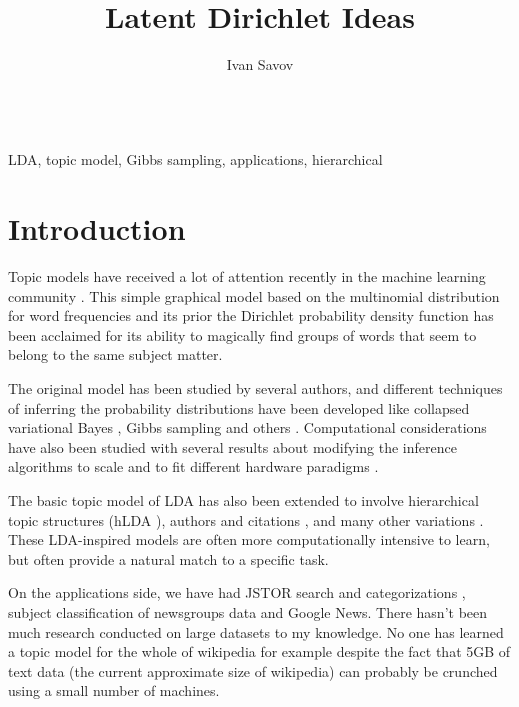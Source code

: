 \documentclass[letterpaper,12pt]{article}
\author{Ivan Savov}
\title{ {\LARGE Latent Dirichlet Ideas } }
\begin{document}
\maketitle


\ \\
 LDA, topic model, Gibbs sampling, applications, hierarchical


\section{Introduction}

	Topic models have received a lot of attention recently in the machine learning 
	community \cite{Blei2003,Blei2009}.
	This simple graphical model based on the multinomial distribution for word frequencies 
	and its prior the Dirichlet probability density function has been acclaimed for
	its ability to magically find groups of words that seem to belong to the same subject matter.
	
	
	The original model has been studied by several authors, and different 
	techniques of inferring the probability distributions have been developed
	like collapsed variational Bayes \cite{teh2007collapsed}, Gibbs sampling \cite{porteous2008fast} and others \cite{Teh2009}.
	Computational considerations have also been studied with several results
	about modifying the inference algorithms to scale \cite{newman2006scalable,newman2007distributed} and to fit 
	different hardware paradigms \cite{masada2009accelerating, yan-parallel}.
	
	The basic topic model of LDA has also been extended to involve hierarchical 
	topic structures (hLDA \cite{blei2004hierarchical}), authors and citations \cite{rosen2004author},  
	and many other variations \cite{williamson2009focused,mimno2007expertise,boyd2007topic}.
	These LDA-inspired models are often more computationally intensive to learn, 
	but often provide a natural match to a specific task.
	
	On the applications side, we have had JSTOR search and categorizations \cite{Blei2009},
	subject classification of newsgroups data and Google News. 
	There hasn't been much research conducted on large datasets to my knowledge. 
	No one has learned a topic model for the whole of wikipedia for example despite the
	fact that 5GB of text data (the current approximate size of wikipedia) can probably
	be crunched using a small number of machines.
	
\end{document}
